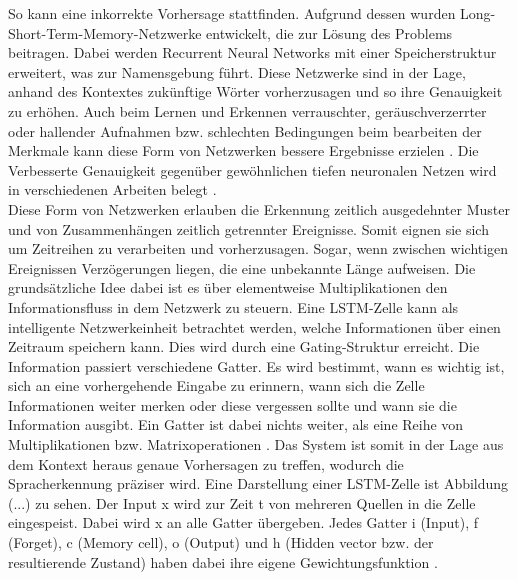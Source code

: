 So kann eine inkorrekte Vorhersage stattfinden. Aufgrund dessen wurden Long-Short-Term-Memory-Netzwerke entwickelt, die zur Lösung des Problems beitragen. Dabei werden Recurrent Neural Networks mit einer Speicherstruktur erweitert, was zur Namensgebung führt. Diese Netzwerke sind in der Lage, anhand des Kontextes zukünftige Wörter vorherzusagen und so ihre Genauigkeit zu erhöhen. Auch beim Lernen und Erkennen verrauschter, geräuschverzerrter oder hallender Aufnahmen bzw. schlechten Bedingungen beim bearbeiten der Merkmale kann diese Form von Netzwerken bessere Ergebnisse erzielen {\cite{Yu.2014}}. Die Verbesserte Genauigkeit gegenüber gewöhnlichen tiefen neuronalen Netzen wird in verschiedenen Arbeiten belegt {\cite{Yu.2014}}{\cite{2015arXiv150706947S}}. 
\\
Diese Form von Netzwerken erlauben die Erkennung zeitlich ausgedehnter Muster und von Zusammenhängen zeitlich getrennter Ereignisse. Somit eignen sie sich um Zeitreihen zu verarbeiten und vorherzusagen. Sogar, wenn zwischen wichtigen Ereignissen Verzögerungen liegen, die eine unbekannte Länge aufweisen. 
Die grundsätzliche Idee dabei ist es über elementweise Multiplikationen den Informationsfluss in dem Netzwerk zu steuern. Eine LSTM-Zelle kann als intelligente Netzwerkeinheit betrachtet werden, welche Informationen über einen Zeitraum speichern kann. Dies wird durch eine Gating-Struktur erreicht. Die Information passiert verschiedene Gatter. Es wird bestimmt, wann es wichtig ist, sich an eine vorhergehende Eingabe zu erinnern, wann sich die Zelle Informationen weiter merken oder diese vergessen sollte und wann sie die Information ausgibt. Ein Gatter ist dabei nichts weiter, als eine Reihe von Multiplikationen bzw. Matrixoperationen {\cite{Yu.2014}}. 
Das System ist somit in der Lage aus dem Kontext heraus genaue Vorhersagen zu treffen, wodurch die Spracherkennung präziser wird. Eine Darstellung einer LSTM-Zelle ist Abbildung (...) zu sehen. Der Input x wird zur Zeit t von mehreren Quellen in die Zelle eingespeist. Dabei wird x an alle Gatter übergeben. Jedes Gatter i (Input), f (Forget), c (Memory cell), o (Output) und h (Hidden vector bzw. der resultierende Zustand) haben dabei ihre eigene Gewichtungsfunktion {\cite{6638947}}.   

